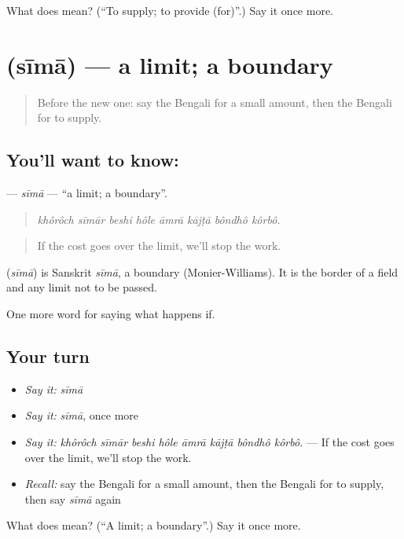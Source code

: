 \begin{tcolorbox}[breakable,colback=teal!4,colframe=teal!35!black,title={Before you move on}]
What does  mean? (\textquotedblleft{}To supply; to provide (for)\textquotedblright{}.) Say it once more.
\end{tcolorbox}
\section[\texorpdfstring{\bn{সীমা} (sīmā)}{সীমা (sīmā)}]{ (sīmā) — a limit; a boundary}

\label{lesson:BN-C371-sima}



\begin{quote}
Before the new one: say the Bengali for a small amount, then the Bengali for to supply.
\end{quote}

\subsection*{You'll want to know: }
\textbf{} — \emph{sīmā} — \textquotedblleft{}a limit; a boundary\textquotedblright{}.

\begin{quote}
       
\end{quote}

\begin{quote}
\emph{khôrôch sīmār beshi hôle āmrā kājṭā bôndhô kôrbô.}
\end{quote}

\begin{quote}
If the cost goes over the limit, we'll stop the work.
\end{quote}

\begin{cousinweb}
\textbf{} (\emph{sīmā}) is Sanskrit \emph{sīmā}, a boundary (Monier-Williams). It is the border of a field and any limit not to be passed.
\end{cousinweb}

\begin{grammarlens}[title={What you've built}]
One more word for saying what happens if.
\end{grammarlens}

\subsection*{Your turn}
\begin{itemize}
\raggedright
  \item \emph{Say it:} \emph{sīmā}
  \item \emph{Say it:} \emph{sīmā}, once more
  \item \emph{Say it:} \emph{khôrôch sīmār beshi hôle āmrā kājṭā bôndhô kôrbô.} — If the cost goes over the limit, we'll stop the work.
  \item \emph{Recall:} say the Bengali for a small amount, then the Bengali for to supply, then say \emph{sīmā} again
\end{itemize}

\begin{tcolorbox}[breakable,colback=teal!4,colframe=teal!35!black,title={Before you move on}]
What does  mean? (\textquotedblleft{}A limit; a boundary\textquotedblright{}.) Say it once more.
\end{tcolorbox}
